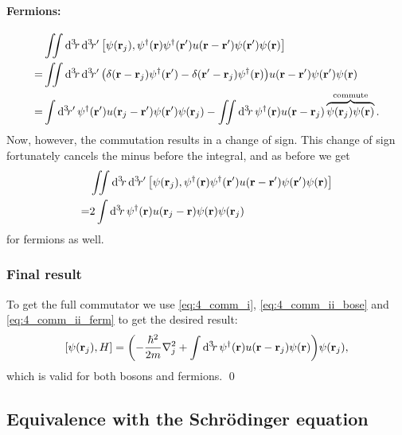 \documentclass[11pt,letter, swedish, english
]{article}
\begin{document}
\paragraph{Fermions:}
\begin{equation}
\begin{aligned}
&\iint\rd^3\!r\,\rd^3\!r'\,
\comm{\psi(\vb{r}_j)}{
\psi^\dagger(\vb{r})\psi^\dagger(\vb{r}')
u(\vb{r}-\vb{r}')\psi(\vb{r}')\psi(\vb{r})}\\
=&\iint\rd^3\!r\,\rd^3\!r'\,
\qty(
\delta(\vb{r}-\vb{r}_j) \psi^\dagger(\vb{r}')
-\delta(\vb{r}'-\vb{r}_j)\psi^\dagger(\vb{r})
)
u(\vb{r}-\vb{r}')\psi(\vb{r}')\psi(\vb{r})\\
=&\int\rd^3\!r'\,
\psi^\dagger(\vb{r}')u(\vb{r}_j-\vb{r}')\psi(\vb{r}')\psi(\vb{r}_j)
-\iint\rd^3\!r\,
\psi^\dagger(\vb{r})u(\vb{r}-\vb{r}_j)
\commute{\psi(\vb{r}_j)\psi(\vb{r})}.
\end{aligned}
\end{equation}
Now, however, the commutation results in a change of sign. This change
of sign fortunately cancels the minus before the integral, and as
before we get
\begin{equation}\label{eq:4_comm_ii_ferm}
\begin{aligned}
&\iint\rd^3\!r\,\rd^3\!r'\,
\comm{\psi(\vb{r}_j)}{
\psi^\dagger(\vb{r})\psi^\dagger(\vb{r}')
u(\vb{r}-\vb{r}')\psi(\vb{r}')\psi(\vb{r})}\\
=&2\int\rd^3\!r\,
\psi^\dagger(\vb{r})u(\vb{r}_j-\vb{r})\psi(\vb{r})\psi(\vb{r}_j)
\end{aligned}
\end{equation}
for fermions as well.

\subsubsection{Final result}
To get the full commutator we use \eqref{eq:4_comm_i},
\eqref{eq:4_comm_ii_bose} and \eqref{eq:4_comm_ii_ferm} to get the desired
result:
\begin{equation}
\comm{\psi(\vb{r}_j)}{H}
=\qty(-\frac{\hbar^2}{2m}\laplacian_j
+\int\rd^3\!r\,
\psi^\dagger(\vb{r})
u(\vb{r}-\vb{r}_j)\psi(\vb{r})
)\psi(\vb{r}_j),
\end{equation}
which is valid for both bosons and fermions.
\qed

\subsection{Equivalence with the Schrödinger equation}
\end{document}

